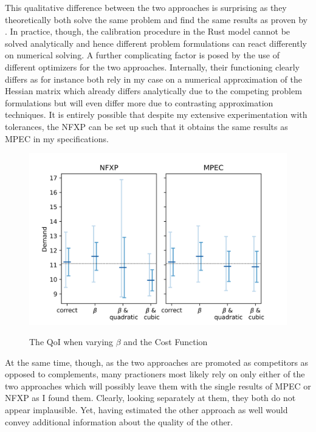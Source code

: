 This qualitative difference between the two approaches is surprising as they theoretically both solve the same problem and find the same results as proven by \cite{Su.Judd.2012}. In practice, though, the calibration procedure in the Rust model cannot be solved analytically and hence different problem formulations can react differently on numerical solving. A further complicating factor is posed by the use of different optimizers for the two approaches. Internally, their functioning clearly differs as for instance both rely in my case on a numerical approximation of the Hessian matrix which already differs analytically due to the competing problem formulations but will even differ more due to contrasting approximation techniques. It is entirely possible that despite my extensive experimentation with tolerances, the NFXP can be set up such that it obtains the same results as MPEC in my specifications.

\begin{figure}[!t]
	\caption{The QoI when varying $\beta$ and the Cost Function}
	\vspace*{-4mm}
	\centering
	\includegraphics[scale=0.9]{../figures/figure_6.png}
	\label{figure6}
\end{figure}

At the same time, though, as the two approaches are promoted as competitors as opposed to complements, many practioners most likely rely on only either of the two approaches which will possibly leave them with the single results of MPEC or NFXP as I found them. Clearly, looking separately at them, they both do not appear implausible. Yet, having estimated the other approach as well would convey additional information about the quality of the other.

